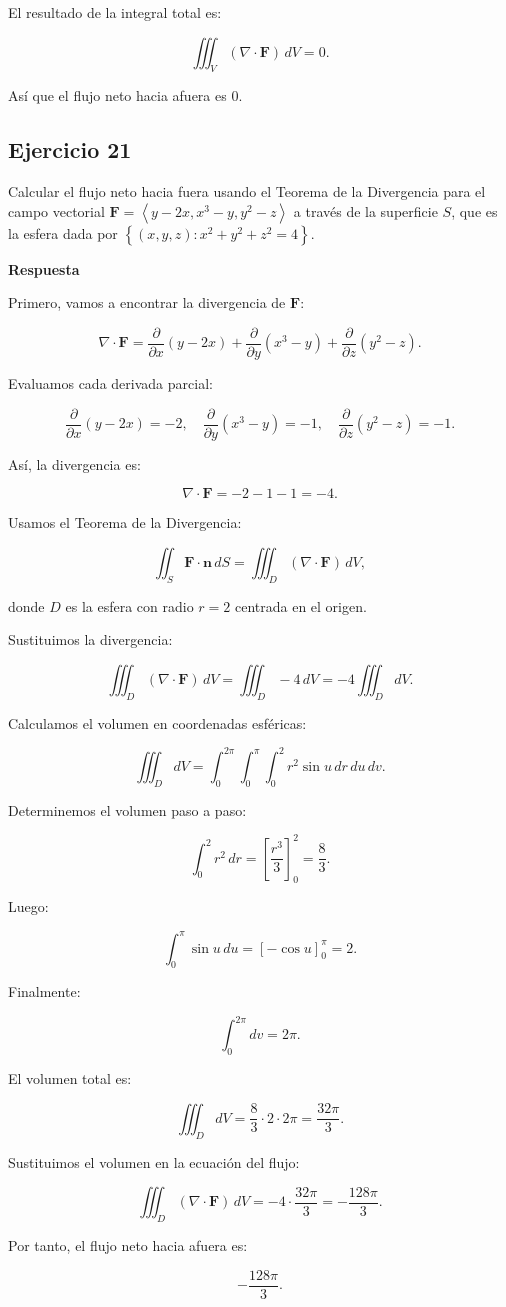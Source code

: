 \documentclass{report}
\begin{document}
El resultado de la integral total es:

\[
\iiint_V (\nabla \cdot \mathbf{F}) \, dV = 0.
\]

Así que el flujo neto hacia afuera es 0.

\subsection*{Ejercicio 21}
Calcular el flujo neto hacia fuera usando el Teorema de la Divergencia para el campo vectorial \(\mathbf{F}=\left\langle y-2 x, x^3-y, y^2-z\right\rangle \) a través de la superficie \( S \), que es la esfera dada por \( \left\{(x, y, z): x^2+y^2+z^2=4\right\} \).

\textbf{Respuesta}

Primero, vamos a encontrar la divergencia de \(\mathbf{F}\):

\[
\nabla \cdot \mathbf{F} = \frac{\partial}{\partial x}(y - 2x) + \frac{\partial}{\partial y}(x^3 - y) + \frac{\partial}{\partial z}(y^2 - z).
\]

Evaluamos cada derivada parcial:

\[
\frac{\partial}{\partial x}(y - 2x) = -2, \quad
\frac{\partial}{\partial y}(x^3 - y) = -1, \quad
\frac{\partial}{\partial z}(y^2 - z) = -1.
\]

Así, la divergencia es:

\[
\nabla \cdot \mathbf{F} = -2 - 1 - 1 = -4.
\]

Usamos el Teorema de la Divergencia:

\[
\iint_S \mathbf{F} \cdot \mathbf{n} \, dS = \iiint_D (\nabla \cdot \mathbf{F}) \, dV,
\]

donde \(D\) es la esfera con radio \(r = 2\) centrada en el origen.

Sustituimos la divergencia:

\[
\iiint_D (\nabla \cdot \mathbf{F}) \, dV = \iiint_D -4 \, dV = -4 \iiint_D dV.
\]

Calculamos el volumen en coordenadas esféricas:

\[
\iiint_D dV = \int_0^{2\pi} \int_0^{\pi} \int_0^2 r^2 \sin u \, dr \, du \, dv.
\]

Determinemos el volumen paso a paso:

\[
\int_0^2 r^2 \, dr = \left[\frac{r^3}{3}\right]_0^2 = \frac{8}{3}.
\]

Luego:

\[
\int_0^{\pi} \sin u \, du = \left[-\cos u\right]_0^{\pi} = 2.
\]

Finalmente:

\[
\int_0^{2\pi} dv = 2\pi.
\]

El volumen total es:

\[
\iiint_D dV = \frac{8}{3} \cdot 2 \cdot 2\pi = \frac{32\pi}{3}.
\]

Sustituimos el volumen en la ecuación del flujo:

\[
\iiint_D (\nabla \cdot \mathbf{F}) \, dV = -4 \cdot \frac{32\pi}{3} = -\frac{128\pi}{3}.
\]

Por tanto, el flujo neto hacia afuera es:

\[
-\frac{128\pi}{3}.
\]
\end{document}
